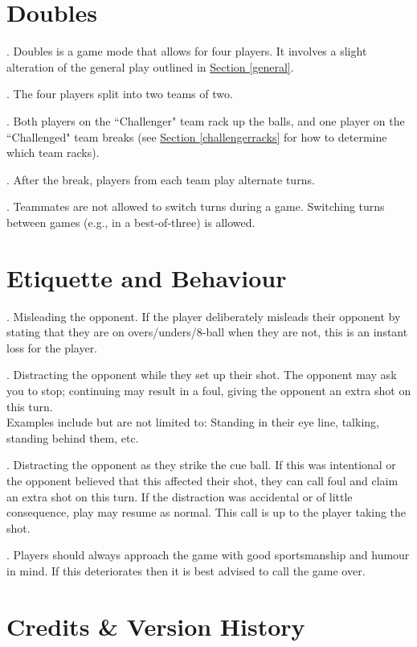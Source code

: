 \documentclass[a4paper, twocolumn]{article}
\def\PageTopMargin{2cm}
\def\PageLeftMargin{2cm}
\newcommand\atxy[3]{%
 \AddThispageHook{\smash{\hspace*{\dimexpr-\PageLeftMargin-\hoffset+#1\relax}%
  \raisebox{\dimexpr\PageTopMargin+\voffset-#2\relax}{#3}}}}
\newcommand{\itemspace}{\vspace{1.2mm}\\}
\newcommand{\placeframe}[1]{\atxy{-0.5cm}{29.1cm}{\texttt{[image: images/frame\#1]}}}
\begin{document}
\section{Doubles} \label{doubles}
\ex. Doubles is a game mode that allows for four players. It involves a slight alteration of the general play outlined in \hyperref[general]{Section \ref*{general}}.\par
\ex. The four players split into two teams of two.\par
\ex. Both players on the “Challenger" team rack up the balls, and one player on the “Challenged" team breaks (see \hyperref[challengerracks]{Section \ref*{challengerracks}} for how to determine which team racks).\par
\ex. After the break, players from each team play alternate turns.\par
\ex. Teammates are not allowed to switch turns during a game. Switching turns between games (e.g., in a best-of-three) is allowed.\par

\section{Etiquette and Behaviour} \label{etiquette}
\ex. \label{misleading}Misleading the opponent. If the player deliberately misleads their opponent by stating that they are on overs/unders/8-ball when they are not, this is an instant loss for the player.\par
\ex. Distracting the opponent while they set up their shot. The opponent may ask you to stop; continuing may result in a foul, giving the opponent an extra shot on this turn.\itemspace Examples include but are not limited to: Standing in their eye line, talking, standing behind them, etc.\par
\ex. Distracting the opponent as they strike the cue ball. If this was intentional or the opponent believed that this affected their shot, they can call foul and claim an extra shot on this turn. If the distraction was accidental or of little consequence, play may resume as normal. This call is up to the player taking the shot.\par
\ex. \label{sportsmanship}Players should always approach the game with good sportsmanship and humour in mind. If this deteriorates then it is best advised to call the game over.\par

\placeframe{4}

\section{Credits \& Version History} \label{credits}
\end{document}
